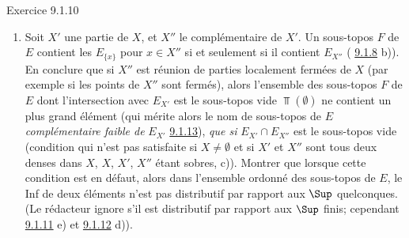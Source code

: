 \documentclass[10pt]{../fichiers-configuration-latex/smfart}
\begin{document}
\begin{enonce*}[remark]{Exercice 9.1.10}
\begin{enumerate}
\item Soit $X'$ une partie de $X$, et $X''$ le complémentaire de
$X'$. Un sous-topos $F$ de $E$ contient les $E_{\{x\}}$ pour $x\in
X''$ si et seulement si il contient $E_{X''}$ (\cf
\hyperref[IV.exer9.1.8]{9.1.8} b)). En conclure que si $X''$ est réunion de
parties localement fermées de $X$ (par exemple si les points de
$X''$ sont fermés), alors l'ensemble des sous-topos $F$ de $E$ dont
l'intersection avec $E_{X'}$ est le sous-topos vide $\Top(∅)$
ne contient un plus grand élément (qui mérite alors le nom de
sous-topos de $E$ \emph{complémentaire faible de} $E_{X'}$ \cf
\hyperref[IV.exer9.1.13]{9.1.13}), \emph{que si} $E_{X'}\cap E_{X''}$ est le
sous-topos vide (condition qui n'est pas satisfaite si $X\neq ∅$
et si $X'$ et $X''$ sont tous deux denses dans $X$, $X$, $X'$, $X''$
étant sobres, \cf c)). Montrer que lorsque cette condition est en
défaut, alors dans l'ensemble ordonné des sous-topos de $E$, le Inf
de deux éléments n'est pas distributif par rapport aux $\Sup$
quelconques. (Le rédacteur ignore s'il est distributif par rapport
aux $\Sup$ finis; \cf cependant \hyperref[IV.exer9.1.11]{9.1.11} e) et
\hyperref[IV.exer9.1.12]{9.1.12} d)).
\end{enumerate}
\end{enonce*}
\end{document}
